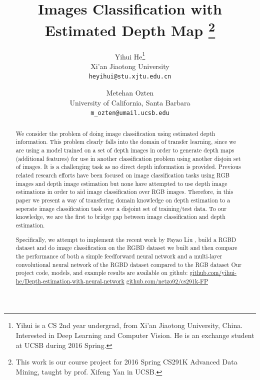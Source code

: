 \documentclass[10pt,twocolumn,letterpaper]{article}
\begin{document}
\title{Images Classification with Estimated Depth Map
\thanks{This work is our course project for 2016 Spring CS291K Advanced Data Mining, taught by prof. Xifeng Yan in UCSB.}}
\author{Yihui He\thanks{Yihui is a CS 2nd year undergrad, 
from Xi'an Jiaotong University, China. 
Interested in Deep Learning and Computer Vision. 
He is an exchange student at UCSB during 2016 Spring.}\\
Xi'an Jiaotong University\\
{\tt\small heyihui@stu.xjtu.edu.cn}
\and
Metehan Ozten\\
University of California, Santa Barbara\\
{\tt\small m\_ozten@umail.ucsb.edu}
}


\maketitle

\begin{abstract}
We consider the problem of doing image classification using estimated depth 
information. This problem clearly falls into the domain of transfer learning, since we are using a model trained on a set of depth images in order to generate depth maps (additional features) for use in another classification problem using another disjoin set of images. It is a challenging task as no direct depth information is 
provided. Previous related research efforts have been focused on image classification tasks using
RGB images and depth image estimation but none have attempted to use depth image estimations in order to aid image classification over RGB images. Therefore, in this paper we present a way of 
transfering domain knowledge on depth estimation to a seperate image classification task over a disjoint set of training/test data. 
To our knowledge, we are the first to bridge gap between image classification 
and depth estimation.

Specifically, we attempt to implement the recent work by Fayao 
Liu \etal\cite{liu2015deep}, build a RGBD dataset and do image classification 
on the RGBD dataset we built and then compare the performance of both a simple feedforward neural network and a multi-layer convolutional neural network of the RGBD dataset compared to the RGB dataset 
Our project code, models, and example results are available on github: \href{
https://github.com/yihui-he/Depth-estimation-with-neural-network 
}{github.com/yihui-he/Depth-estimation-with-neural-network}
\href{https://github.com/netzo92/cs291k-FP}{github.com/netzo92/cs291k-FP}
\end{abstract}
\end{document}
